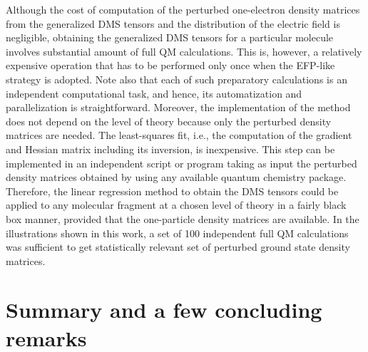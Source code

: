 \documentclass[aip,jcp,preprint,amsmath,amssymb,floatfix]{revtex4-1}
\begin{document}
Although the cost of computation of the perturbed one\hyp{}electron density matrices
from the generalized DMS tensors and the distribution of the electric field is negligible, 
obtaining the generalized DMS tensors for a particular molecule
involves substantial amount of full QM calculations. %
This is, however, a relatively expensive operation that has to be performed only once
when the EFP\hyp{}like strategy is adopted. 
Note also that each of such preparatory calculations is an independent computational task, 
and hence, its automatization and parallelization is straightforward. Moreover, the implementation
of the method does not depend on the level of theory because only the perturbed density matrices
are needed. The least\hyp{}squares fit, i.e., the computation of the gradient
and Hessian matrix including its inversion, is inexpensive.
This step can be implemented in an independent script or program taking as input the
perturbed density matrices obtained by using any available quantum chemistry package. 
Therefore, the linear regression method to obtain the DMS tensors could be applied 
to any molecular fragment at a chosen level of theory
in a fairly black box manner, provided that
the one\hyp{}particle density matrices are available. In the illustrations shown in this work,
a set of 100 independent full QM calculations was sufficient to get statistically relevant set of perturbed 
ground state density matrices. 

\section{\label{s:5}Summary and a few concluding remarks}
\end{document}
